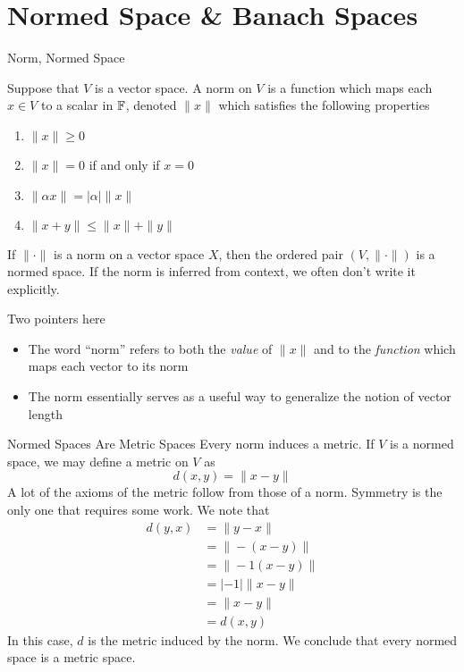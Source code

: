 \documentclass[10pt]{beamer}
\begin{document}
		\section{Normed Space \& Banach Spaces}

		\begin{frame}{Norm, Normed Space}
				\begin{definition}
						Suppose that $V$ is a vector space. A \alert{norm} on $V$ is a function which maps each $x\in V$ to a scalar in $\mathbb{F}$, denoted $\|x\|$ which satisfies the following properties
						\begin{enumerate}
								\item $\|x\| \geq 0$ 
								\item $\|x\| = 0$ if and only if $x = 0$ 
								\item $\|\alpha x\| = |\alpha| \|x\|$
								\item $\|x + y\| \leq \|x\| + \|y\|$
						\end{enumerate}
						If $\| \cdot \|$ is a norm on a vector space $X$, then the ordered pair $(V, \|\cdot\|)$ is a \alert{normed space}. If the norm is inferred from context, we often don't write it explicitly. 
				\end{definition}
				Two pointers here 
				\begin{itemize}
						\item<2-> The word ``norm'' refers to both the \emph{value} of $\|x\|$ and to the \emph{function} which maps each vector to its norm 
								\item<3-> The norm essentially serves as a useful way to generalize the notion of vector length
				\end{itemize}
		\end{frame}

		\begin{frame}{Normed Spaces Are Metric Spaces}
				Every norm induces a metric. If $V$ is a normed space, we may define a metric on $V$ as 
				\begin{equation*}
						d(x, y) = \|x - y\|
				\end{equation*}
				A lot of the axioms of the metric follow from those of a norm. Symmetry is the only one that requires some work. We note that 
				\begin{align*}
						d(y, x) &= \|y - x\| \\ 
										&= \|-(x - y)\| \\ 
										&= \|-1(x - y)\| \\ 
										&= |-1| \|x-y\| \\ 
										&= \|x - y\| \\ 
										&= d(x, y)
				\end{align*}
				In this case, $d$ is the \alert{metric induced by the norm}. We conclude that every normed space is a metric space. 
		\end{frame}
\end{document}
